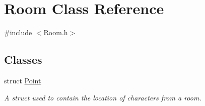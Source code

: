\hypertarget{classRoom}{\section{Room Class Reference}
\label{classRoom}
}


{\ttfamily \#include $<$Room.\-h$>$}

\subsection*{Classes}
\begin{DoxyCompactItemize}
\item 
struct \hyperlink{structRoom_1_1Point}{Point}
\begin{DoxyCompactList}\small\item\em A struct used to contain the location of characters from a room. \end{DoxyCompactList}\end{DoxyCompactItemize}
